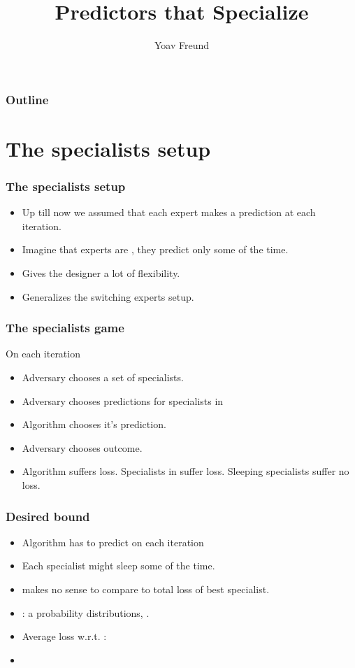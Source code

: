 \documentclass[handout]{beamer}
\title [Specialists] %
{Predictors that Specialize}
\author[Freund] %
{Yoav Freund}
\institute[Universities of Somewhere and Elsewhere] %
\begin{document}
%

\begin{frame}
  \titlepage
\end{frame}

\begin{frame}
  \frametitle{Outline}
  \tableofcontents[pausesections]
\end{frame}

\section{The specialists setup}

\begin{frame}
\frametitle{The specialists setup}
\begin{itemize}
\item Up till now we assumed that each expert makes a prediction at each iteration.
\item Imagine that experts are , they predict only some of the time.
\item Gives the designer a lot of flexibility.
\item Generalizes the switching experts setup.
\end{itemize}
\end{frame}

\begin{frame}
\frametitle{The specialists game}
On each iteration 
\begin{itemize}
\item Adversary chooses a set  of  specialists.
\item Adversary chooses predictions for specialists in 
\item Algorithm chooses it's prediction.
\item Adversary chooses outcome.
\item Algorithm suffers loss. Specialists in  suffer loss. Sleeping specialists suffer no loss.
\end{itemize}
\end{frame}

\begin{frame}
\frametitle{Desired bound}
\begin{itemize}
\item Algorithm has to predict on each iteration
\item Each specialist might sleep some of the time.
\item \R{$\Rightarrow$} makes no sense to compare to total loss of best specialist.
\item \R{$\vu$}: a probability distributions, 
.
\item Average loss w.r.t. \R{$\vu$}:
\item {} 
\end{itemize}
\end{frame}
\end{document}
